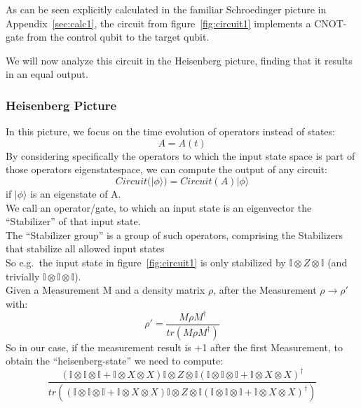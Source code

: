 As can be seen explicitly calculated in the familiar Schroedinger 
picture in Appendix~\ref{sec:calc1}, the circuit from figure~\ref{fig:circuit1}
implements a CNOT-gate from the control qubit to the target qubit.

We will now analyze this circuit in the Heisenberg picture,
finding that it results in an equal output.

\subsubsection{Heisenberg Picture}
In this picture, we focus on the time evolution of operators instead
of states:
\begin{equation}
	A = A(t)
\end{equation}
By considering specifically the operators to which the input state
space is part of those operators eigenstatespace, we can compute
the output of any circuit:
\begin{equation}
	Circuit(|\phi\rangle) = Circuit(A)|\phi\rangle
\end{equation}
if $|\phi\rangle$ is an eigenstate of A.\\
We call an operator/gate, to which an input state is an eigenvector the 
``Stabilizer'' of that input state. \\
The ``Stabilizer group'' is a group of such operators, comprising the
Stabilizers that stabilize all allowed input states \\
So e.g.\ the input state in figure~\ref{fig:circuit1} is only 
stabilized by $\mathbb{I} \otimes Z \otimes \mathbb{I}$ 
(and trivially $\mathbb{I} \otimes \mathbb{I} \otimes \mathbb{I}$).\\
Given a Measurement M and a density matrix $\rho$, after the Measurement
$\rho\rightarrow\rho'$ with:
\begin{equation}
	\rho'=\frac{M\rho M^{\dag}}{tr(M\rho M^{\dag})}
\end{equation}
So in our case, if the measurement result is +1 after the first Measurement,
to obtain the ``heisenberg-state'' we need to compute:
\begin{equation}
	\frac{(\mathbb{I}\otimes\mathbb{I}\otimes\mathbb{I}+
	\mathbb{I}\otimes X \otimes X) \mathbb{I} \otimes Z \otimes \mathbb{I}
	(\mathbb{I}\otimes\mathbb{I}\otimes\mathbb{I}+
	\mathbb{I}\otimes X \otimes X)^{\dag}}{tr((\mathbb{I}\otimes\mathbb{I}\otimes\mathbb{I}+
	\mathbb{I}\otimes X \otimes X) \mathbb{I} \otimes Z \otimes \mathbb{I}
	(\mathbb{I}\otimes\mathbb{I}\otimes\mathbb{I}+
	\mathbb{I}\otimes X \otimes X)^{\dag})}
\end{equation}












